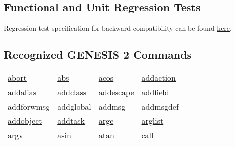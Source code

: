 \documentclass[12pt]{article}
\begin{document}
\subsection*{Functional and Unit Regression Tests}

Regression test specification for backward compatibility can be found \href{http://www.neurospaces.org/neurospaces_project/ns-sli/tests/html/index.html}{here}.

\subsection*{Recognized GENESIS 2 Commands}

\begin{tabular}{l l l l}

\href{http://genesis-sim.org/GENESIS/Hyperdoc/Manual-25.html#ss25.1}{abort}                          & \href{http://genesis-sim.org/GENESIS/Hyperdoc/Manual-25.html#ss25.2}{abs}                        & \href{http://genesis-sim.org/GENESIS/Hyperdoc/Manual-25.html#ss25.3}{acos}              & \href{http://genesis-sim.org/GENESIS/Hyperdoc/Manual-25.html#ss25.4}{addaction}          \\
\href{http://genesis-sim.org/GENESIS/Hyperdoc/Manual-25.html#ss25.5}{addalias	}		& \href{http://genesis-sim.org/GENESIS/Hyperdoc/Manual-25.html#ss25.6}{addclass}		& \href{http://genesis-sim.org/GENESIS/Hyperdoc/Manual-25.html#ss25.7}{addescape}	& \href{http://genesis-sim.org/GENESIS/Hyperdoc/Manual-25.html#ss25.8}{addfield}		\\         
\href{http://genesis-sim.org/GENESIS/Hyperdoc/Manual-25.html#ss25.9}{addforwmsg}		& \href{http://genesis-sim.org/GENESIS/Hyperdoc/Manual-25.html#ss25.10}{addglobal}		& \href{http://genesis-sim.org/GENESIS/Hyperdoc/Manual-25.html#ss25.11}{addmsg} 	& \href{http://genesis-sim.org/GENESIS/Hyperdoc/Manual-25.html#ss25.12}{addmsgdef}	\\
\href{http://genesis-sim.org/GENESIS/Hyperdoc/Manual-25.html#ss25.13}{addobject}		& \href{http://genesis-sim.org/GENESIS/Hyperdoc/Manual-25.html#ss25.14}{addtask}		& \href{http://genesis-sim.org/GENESIS/Hyperdoc/Manual-25.html#ss25.15}{argc} 		& \href{http://genesis-sim.org/GENESIS/Hyperdoc/Manual-25.html#ss25.16}{arglist}		\\
\href{http://genesis-sim.org/GENESIS/Hyperdoc/Manual-25.html#ss25.17}{argv}			& \href{http://genesis-sim.org/GENESIS/Hyperdoc/Manual-25.html#ss25.19}{asin}			& \href{http://genesis-sim.org/GENESIS/Hyperdoc/Manual-25.html#ss25.20}{atan} 		& \href{http://genesis-sim.org/GENESIS/Hyperdoc/Manual-25.html#ss25.21}{call}			\\

\end{tabular}
\end{document}
